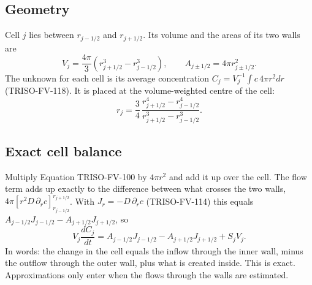 \documentclass[11pt]{article}
\begin{document}
\subsection{Geometry}
Cell $j$ lies between $r_{j-1/2}$ and $r_{j+1/2}$. Its volume and the areas of its two walls are
\begin{equation}
V_j=\frac{4\pi}{3}\left(r_{j+1/2}^3-r_{j-1/2}^3\right),\qquad A_{j\pm1/2}=4\pi r_{j\pm1/2}^2.
\tag{TRISO-FV-101}
\end{equation}
The unknown for each cell is its average concentration $C_j=V_j^{-1}\int c\,4\pi r^2dr$ (TRISO-FV-118). It is placed at the volume-weighted centre of the cell:
\begin{equation}
r_j=\frac{3}{4}\,\frac{r_{j+1/2}^4-r_{j-1/2}^4}{r_{j+1/2}^3-r_{j-1/2}^3}.
\tag{TRISO-FV-109A}
\end{equation}

\subsection{Exact cell balance}
Multiply Equation TRISO-FV-100 by $4\pi r^2$ and add it up over the cell. The flow term adds up exactly to the difference between what crosses the two walls, $4\pi\left[r^2D\,\partial_rc\right]_{r_{j-1/2}}^{r_{j+1/2}}$. With $J_r=-D\,\partial_rc$ (TRISO-FV-114) this equals $A_{j-1/2}J_{j-1/2}-A_{j+1/2}J_{j+1/2}$, so
\begin{equation}
V_j\frac{dC_j}{dt}=A_{j-1/2}J_{j-1/2}-A_{j+1/2}J_{j+1/2}+S_jV_j.
\tag{TRISO-FV-123}
\end{equation}
In words: the change in the cell equals the inflow through the inner wall, minus the outflow through the outer wall, plus what is created inside. This is exact. Approximations only enter when the flows through the walls are estimated.
\end{document}
